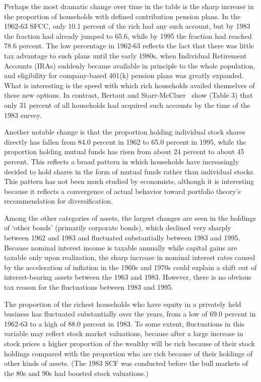 \documentclass[12pt]{article}
\begin{document}
Perhaps the most dramatic change over time in the table is the sharp
increase in the proportion of households with defined contribution pension
plans. In the 1962-63 SFCC, only 10.1 percent of the rich had any such
account, but by 1983 the fraction had already jumped to 65.6, while by 1995
the fraction had reached 78.6 percent. The low percentage in 1962-63
reflects the fact that there was little tax advantage to such plans until
the early 1980s, when Individual Retirement Accounts (IRAs) suddenly became
available in principle to the whole population, and eligibility for
company-based 401(k) pension plans was greatly expanded. What is interesting
is the speed with which rich households availed themselves of these new
options. In contrast, Bertaut and Starr-McCluer~\cite{b&s-m:usportfolios}%
 show (Table 3) that
only 31 percent of all households had acquired such accounts by the time of
the 1983 survey.

Another notable change is that the proportion holding individual stock
shares directly has fallen from 84.0 percent in 1962 to 65.0 percent in
1995, while the proportion holding mutual funds has risen from about 24
percent to about 45 percent. This reflects a broad pattern in which
households have increasingly decided to hold shares in the form of mutual
funds rather than individual stocks. This pattern has not been much studied
by economists, although it is interesting because it reflects a convergence
of actual behavior toward portfolio theory's recommendation for
diversification.

Among the other categories of assets, the largest changes are seen in the
holdings of `other bonds' (primarily corporate bonds), which declined very
sharply between 1962 and 1983 and fluctuated substantially between 1983 and
1995. Because nominal interest income is taxable annually while capital
gains are taxable only upon realization, the sharp increase in nominal
interest rates caused by the acceleration of inflation in the 1960s and
1970s could explain a shift out of interest-bearing assets between the 1963
and 1983. However, there is no obvious tax reason for the fluctuations
between 1983 and 1995.

The proportion of the richest households who have equity in a privately held
business has fluctuated substantially over the years, from a low of 69.0
percent in 1962-63 to a high of 88.0 percent in 1983. To some extent,
fluctuations in this variable may reflect stock market valuations, because
after a large increase in stock prices a higher proportion of the wealthy
will be rich because of their stock holdings compared with the proportion
who are rich because of their holdings of other kinds of assets. (The 1983
SCF was conducted before the bull markets of the 80s and 90s had boosted
stock valuations.)
\end{document}
